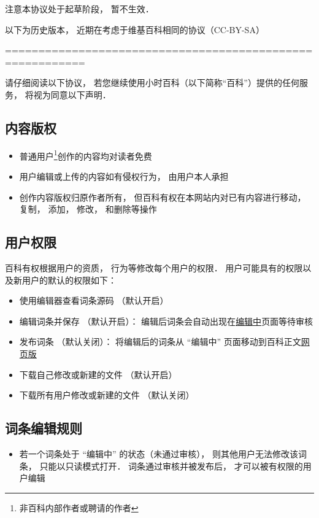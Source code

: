 
注意本协议处于起草阶段， 暂不生效．

以下为历史版本， 近期在考虑于维基百科相同的协议（CC-BY-SA）

==========================================================

请仔细阅读以下协议， 若您继续使用小时百科（以下简称“百科”）提供的任何服务， 将视为同意以下声明．

\subsection{内容版权}
\begin{itemize}
\item 普通用户\footnote{非百科内部作者或聘请的作者}创作的内容均对读者免费
\item 用户编辑或上传的内容如有侵权行为， 由用户本人承担
\item 创作内容版权归原作者所有， 但百科有权在本网站内对已有内容进行移动， 复制， 添加， 修改， 和删除等操作
\end{itemize}

\subsection{用户权限}
百科有权根据用户的资质， 行为等修改每个用户的权限． 用户可能具有的权限以及新用户的默认的权限如下：
\begin{itemize}
\item 使用编辑器查看词条源码 （默认开启）
\item 编辑词条并保存 （默认开启）： 编辑后词条会自动出现在\href{http://wuli.wiki/changed}{编辑中}页面等待审核
\item 发布词条 （默认关闭）： 将编辑后的词条从 “编辑中” 页面移动到百科正文\href{http://wuli.wiki/online}{网页版}
\item 下载自己修改或新建的文件 （默认开启）
\item 下载所有用户修改或新建的文件 （默认关闭）
\end{itemize}

\subsection{词条编辑规则}
\begin{itemize}
\item 若一个词条处于 “编辑中” 的状态（未通过审核）， 则其他用户无法修改该词条， 只能以只读模式打开． 词条通过审核并被发布后， 才可以被有权限的用户编辑
\end{itemize}
